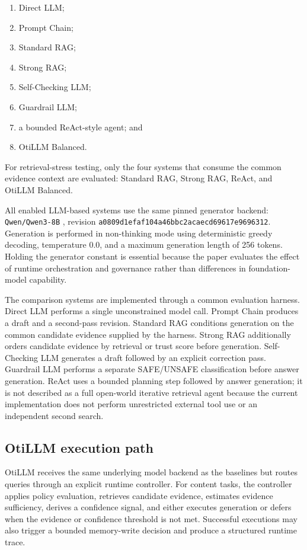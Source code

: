 \documentclass[manuscript, screen, review]{jair}
\begin{document}
\begin{enumerate}
\item Direct LLM;
\item Prompt Chain;
\item Standard RAG;
\item Strong RAG;
\item Self-Checking LLM;
\item Guardrail LLM;
\item a bounded ReAct-style agent; and
\item OtiLLM Balanced.\end{enumerate}

For retrieval-stress testing, only the four systems that consume the common
evidence context are evaluated: Standard RAG, Strong RAG, ReAct, and OtiLLM
Balanced.

All enabled LLM-based systems use the same pinned generator backend:
\nolinkurl{Qwen/Qwen3-8B} \citep{yang2025qwen3}, revision
\nolinkurl{a0809d1efaf104a46bbc2acaecd69617e9696312}. Generation is performed in
non-thinking mode using deterministic greedy decoding, temperature 0.0, and a
maximum generation length of 256 tokens. Holding the generator constant is
essential because the paper evaluates the effect of runtime orchestration and
governance rather than differences in foundation-model capability.

The comparison systems are implemented through a common evaluation harness.
Direct LLM performs a single unconstrained model call. Prompt Chain produces a
draft and a second-pass revision. Standard RAG conditions generation on the
common candidate evidence supplied by the harness. Strong RAG additionally
orders candidate evidence by retrieval or trust score before generation.
Self-Checking LLM generates a draft followed by an explicit correction pass.
Guardrail LLM performs a separate SAFE/UNSAFE classification before answer
generation. ReAct uses a bounded planning step followed by answer generation;
it is not described as a full open-world iterative retrieval agent because the
current implementation does not perform unrestricted external tool use or an
independent second search.



\subsection{OtiLLM execution path}

OtiLLM receives the same underlying model backend as the baselines but routes
queries through an explicit runtime controller. For content tasks, the
controller applies policy evaluation, retrieves candidate evidence, estimates
evidence sufficiency, derives a confidence signal, and either executes
generation or defers when the evidence or confidence threshold is not met.
Successful executions may also trigger a bounded memory-write decision and
produce a structured runtime trace.
\end{document}

